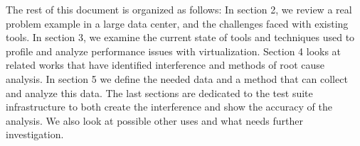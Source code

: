 \indent The rest of this document is organized as follows:  In section 2, we review a real problem example in a large data center, and the challenges faced with existing tools.  In section 3, we examine the current state of tools and techniques used to profile and analyze performance issues with virtualization.  Section 4 looks at related works that have identified interference and methods of root cause analysis.  In section 5 we define the needed data and a method that can collect and analyze this data.  The last sections are dedicated to the test suite infrastructure to both create the interference and show the accuracy of the analysis.  We also look at possible other uses and what needs further investigation.
